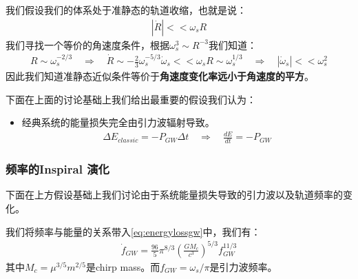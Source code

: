 \bigskip
{}

我们假设我们的体系处于准静态的轨道收缩，也就是说：
\begin{align}
  |\dot{R}| << \omega_s R
\end{align}
我们寻找一个等价的角速度条件，根据$ \omega_s^3 \sim R^{-3} $我们知道：
\begin{align}
  R \sim \omega_s^{-2/3} \quad \Rightarrow \quad \dot{R} \sim
  -\displaystyle\frac{2}{3} \omega_s^{-5/3} \dot{\omega}_s <<
  \omega_s R \sim \omega_s^{1/3} \quad \Rightarrow \quad
  |\dot{\omega}_s| <<  \omega_s^2
\end{align}
因此我们知道准静态近似条件等价于\textbf{角速度变化率远小于角速度的平方}。

\bigskip
{}

下面在上面的讨论基础上我们给出最重要的假设我们认为：
\begin{itemize}
  \item 经典系统的能量损失完全由引力波辐射导致。
    \begin{align}\label{eq:energylossgw}
      \Delta E_{classic} = - P_{GW} \Delta t \quad \Rightarrow \quad
      \displaystyle\frac{dE}{dt} = - P_{GW}
    \end{align}
\end{itemize}

\subsubsection{频率的Inspiral 演化}

下面在上方假设基础上我们讨论由于系统能量损失导致的引力波以及轨道频率的变化。

\bigskip
{}

我们将频率与能量的关系带入\cref{eq:energylossgw}中，我们有：
\begin{align}
  \dot{f}_{GW} = \displaystyle\frac{96}{5} \pi^{8/3}
  \left(\displaystyle\frac{GM_c}{c^3}\right)^{5/3} f_{GW}^{11/3}
\end{align}
其中$ M_c = \mu^{3/5} m^{2/5} $是chirp mass。而$ f_{GW} = \omega_s/\pi $是引力波频率。

\bigskip
{}

